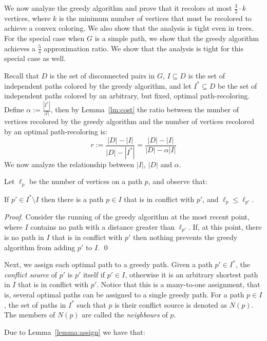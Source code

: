 We now analyze the greedy algorithm and prove that it recolors at most 
$\frac{3}{2} \cdot k$ vertices, 
where $k$ is the minimum number of vertices that must be recolored to achieve a convex
coloring.
%
We also show that the analysis is tight even in trees.
%
For the special case when $G$ is a simple path, 
we show that the greedy algorithm achieves a $\frac{5}{4}$ approximation ratio.
We show that the analysis is tight for this special case as well.

Recall that $D$ is the set of disconnected pairs in $G$, 
$I \subseteq D$ is the set of independent paths colored by the greedy algorithm, 
and let $I^* \subseteq D$ be the set of independent paths colored by an arbitrary, 
but fixed,
optimal path-recoloring.  
%
Define $\alpha := \frac{|I^*|}{|I|}$,
then by Lemma~\ref{lm:cost} the ratio between the number of 
vertices recolored by the greedy algorithm and the number of vertices
recolored by an optimal path-recoloring is:
\[
r := \frac{|D| - |I|}{|D| - |I^*|}
= \frac{|D| - |I|}{|D| - \alpha |I|}
\]
We now analyze the relationship between $|I|$, $|D|$ and $\alpha$.

Let $\ell_p$ be the number of vertices on a path $p$, and observe that:

\begin{lemma}
\label{lemma:assign}
If $p' \in I^* \setminus I$ then there is a path $p \in I$ that is in
conflict with $p'$, and $\ell_p \leq \ell_{p'}$.
\end{lemma}
\begin{proof}
Consider the running of the greedy algorithm at the most recent point,
where $I$ contains no path with a distance greater than $\ell_{p'}$.  If,
at this point, there is no path in $I$ that is in conflict with $p'$
then nothing prevents the greedy algorithm from adding $p'$ to $I$.
\qed{}\end{proof}

Next, we assign each optimal path to a greedy path.
%
Given a path $p' \in I^*$, the \emph{conflict source} of $p'$ is $p'$
itself if $p' \in I$, otherwise it is an arbitrary shortest path in
$I$ that is in conflict with $p'$.
%
Notice that this is a many-to-one assignment, that is, several optimal
paths can be assigned to a single greedy path.
%
For a path $p \in I$, the set of paths in $I^*$ such that $p$ is their
conflict source is denoted as $N(p)$.  The members of $N(p)$ are
called the \emph{neighbours} of $p$.

Due to Lemma~\ref{lemma:assign} we have that:

